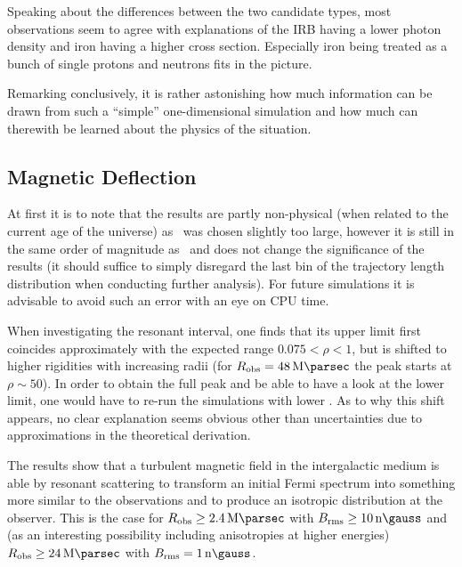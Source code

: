 Speaking about the differences between the two candidate types, most
observations seem to agree with explanations of the IRB having a lower photon
density and iron having a higher cross section. Especially iron being treated
as a bunch of single protons and neutrons fits in the picture.

Remarking conclusively, it is rather astonishing how much information can be
drawn from such a \enquote{simple} one-dimensional simulation and how much can
therewith be learned about the physics of the situation.


\subsection{Magnetic Deflection}
At first it is to note that the results are partly non-physical (when related
to the current age of the universe) as \dmax~was chosen slightly too large,
however it is still in the same order of magnitude as \dAoU~and does not
change the significance of the results (it should suffice to simply disregard
the last bin of the trajectory length distribution when conducting further
analysis). For future simulations it is advisable to avoid such an error with
an eye on CPU time.

When investigating the resonant interval, one finds that its upper limit first
coincides approximately with the expected range $0.075<\rho<1$, but is shifted
to higher rigidities with increasing radii (for
$\Robserver=\SI{48}{\mega\parsec}$ the peak starts at $\rho\sim\num{50}$). In
order to obtain the full peak and be able to have a look at the lower limit,
one would have to re-run the simulations with lower \Emin.
As to why this shift appears, no clear explanation seems obvious other than
uncertainties due to approximations in the theoretical derivation.

The results show that a turbulent magnetic field in the intergalactic medium is
able by resonant scattering to transform an initial Fermi spectrum into
something more similar to the observations and to produce an isotropic
distribution at the observer. This is the case for
$\Robserver\ge\SI{2.4}{\mega\parsec}$ with $\Brms\ge\SI{10}{\nano\gauss}$ and
(as an interesting possibility including anisotropies at higher energies)
$\Robserver\ge\SI{24}{\mega\parsec}$ with $\Brms=\SI{1}{\nano\gauss}$.

